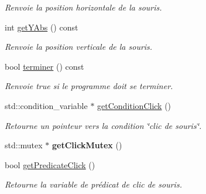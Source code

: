 \begin{DoxyCompactItemize}
\begin{DoxyCompactList}\small\item\em Renvoie la position horizontale de la souris. \end{DoxyCompactList}\item 
\hypertarget{classInput_a787b3647ae45a29b371517efb54bba20}{int \hyperlink{classInput_a787b3647ae45a29b371517efb54bba20}{get\+Y\+Abs} () const }\label{classInput_a787b3647ae45a29b371517efb54bba20}

\begin{DoxyCompactList}\small\item\em Renvoie la position verticale de la souris. \end{DoxyCompactList}\item 
\hypertarget{classInput_a2d977cfea35296f15cd55829f99be9a4}{bool \hyperlink{classInput_a2d977cfea35296f15cd55829f99be9a4}{terminer} () const }\label{classInput_a2d977cfea35296f15cd55829f99be9a4}

\begin{DoxyCompactList}\small\item\em Renvoie true si le programme doit se terminer. \end{DoxyCompactList}\item 
\hypertarget{classInput_a126cfa9be2f3c2f87b816056690ff3ca}{std\+::condition\+\_\+variable $\ast$ \hyperlink{classInput_a126cfa9be2f3c2f87b816056690ff3ca}{get\+Condition\+Click} ()}\label{classInput_a126cfa9be2f3c2f87b816056690ff3ca}

\begin{DoxyCompactList}\small\item\em Retourne un pointeur vers la condition \char`\"{}clic de souris\char`\"{}. \end{DoxyCompactList}\item 
\hypertarget{classInput_aa21a97ce5f6f049ec8eb4a73affe5ba4}{std\+::mutex $\ast$ {\bfseries get\+Click\+Mutex} ()}\label{classInput_aa21a97ce5f6f049ec8eb4a73affe5ba4}

\item 
\hypertarget{classInput_ad225c02b0738984bb2d2858ab445d8a8}{bool \hyperlink{classInput_ad225c02b0738984bb2d2858ab445d8a8}{get\+Predicate\+Click} ()}\label{classInput_ad225c02b0738984bb2d2858ab445d8a8}

\begin{DoxyCompactList}\small\item\em Retourne la variable de prédicat de clic de souris. \end{DoxyCompactList}\end{DoxyCompactItemize}


